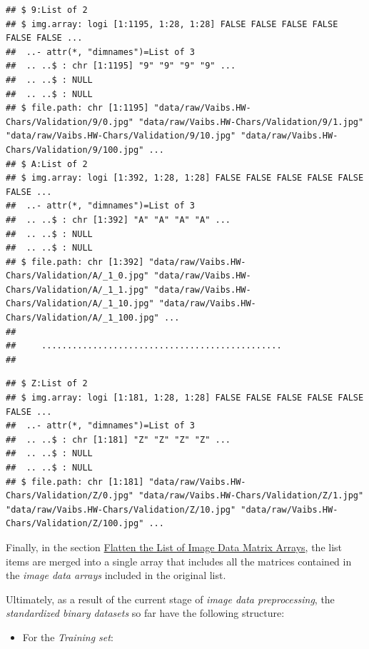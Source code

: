 \documentclass[
]{report}
\providecommand{\tightlist}{%
  \setlength{\itemsep}{0pt}\setlength{\parskip}{0pt}}
\begin{document}
\normalsize

\footnotesize

\begin{verbatim}
## $ 9:List of 2
## $ img.array: logi [1:1195, 1:28, 1:28] FALSE FALSE FALSE FALSE FALSE FALSE ...
##  ..- attr(*, "dimnames")=List of 3
##  .. ..$ : chr [1:1195] "9" "9" "9" "9" ...
##  .. ..$ : NULL
##  .. ..$ : NULL
## $ file.path: chr [1:1195] "data/raw/Vaibs.HW-Chars/Validation/9/0.jpg" "data/raw/Vaibs.HW-Chars/Validation/9/1.jpg" "data/raw/Vaibs.HW-Chars/Validation/9/10.jpg" "data/raw/Vaibs.HW-Chars/Validation/9/100.jpg" ...
## $ A:List of 2
## $ img.array: logi [1:392, 1:28, 1:28] FALSE FALSE FALSE FALSE FALSE FALSE ...
##  ..- attr(*, "dimnames")=List of 3
##  .. ..$ : chr [1:392] "A" "A" "A" "A" ...
##  .. ..$ : NULL
##  .. ..$ : NULL
## $ file.path: chr [1:392] "data/raw/Vaibs.HW-Chars/Validation/A/_1_0.jpg" "data/raw/Vaibs.HW-Chars/Validation/A/_1_1.jpg" "data/raw/Vaibs.HW-Chars/Validation/A/_1_10.jpg" "data/raw/Vaibs.HW-Chars/Validation/A/_1_100.jpg" ...
## 
##     ...............................................
## 
\end{verbatim}

\normalsize

\footnotesize

\begin{verbatim}
## $ Z:List of 2
## $ img.array: logi [1:181, 1:28, 1:28] FALSE FALSE FALSE FALSE FALSE FALSE ...
##  ..- attr(*, "dimnames")=List of 3
##  .. ..$ : chr [1:181] "Z" "Z" "Z" "Z" ...
##  .. ..$ : NULL
##  .. ..$ : NULL
## $ file.path: chr [1:181] "data/raw/Vaibs.HW-Chars/Validation/Z/0.jpg" "data/raw/Vaibs.HW-Chars/Validation/Z/1.jpg" "data/raw/Vaibs.HW-Chars/Validation/Z/10.jpg" "data/raw/Vaibs.HW-Chars/Validation/Z/100.jpg" ...
\end{verbatim}

\normalsize

\newpage

Finally, in the section \href{https://github.com/AzKurban-edX-DS/edx.capstone.choose-your-own/blob/main/r/support-scripts/raw-img.dat2std_bin.R\#L204-L269}{Flatten the List of Image Data Matrix Arrays}, the list items are merged into a single array that includes all the matrices contained in the \emph{image data arrays} included in the original list.

Ultimately, as a result of the current stage of \emph{image data preprocessing}, the \emph{standardized binary datasets} so far have the following structure:

\begin{itemize}
\tightlist
\item
  For the \emph{Training set}:
\end{itemize}
\end{document}
